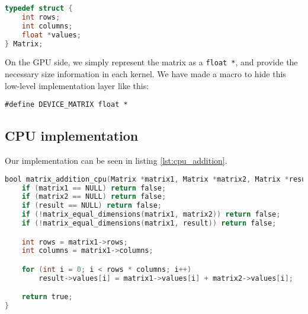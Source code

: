 \begin{lstlisting}[language=C, caption={Second implementation of the matrix data structure.}, label={lst:second_data_structure}]
typedef struct {
    int rows;
    int columns;
    float *values;
} Matrix;
\end{lstlisting}

On the GPU side, we simply represent the matrix as a \texttt{float *}, and provide the necessary size information in each kernel. We have made a macro to hide this low-level implementation layer like this: 

\texttt{\#define DEVICE\_MATRIX float *}

\subsection{CPU implementation}

Our implementation can be seen in listing \ref{lst:cpu_addition}.

\begin{lstlisting}[language=C, caption={Second implementation of the matrix data structure.}, label={lst:cpu_addition}]
bool matrix_addition_cpu(Matrix *matrix1, Matrix *matrix2, Matrix *result) {
    if (matrix1 == NULL) return false;
    if (matrix2 == NULL) return false;
    if (result == NULL) return false;
    if (!matrix_equal_dimensions(matrix1, matrix2)) return false;
    if (!matrix_equal_dimensions(matrix1, result)) return false;

    int rows = matrix1->rows;
    int columns = matrix1->columns;

    for (int i = 0; i < rows * columns; i++)
        result->values[i] = matrix1->values[i] + matrix2->values[i];

    return true;
}
\end{lstlisting}
